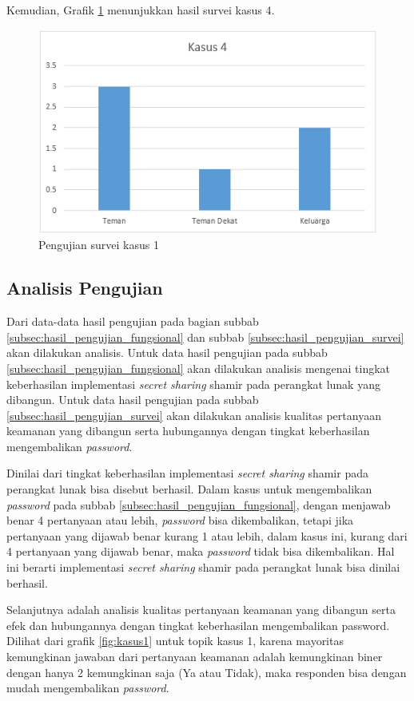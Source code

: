 Kemudian, Grafik \ref{fig:kasus4} menunjukkan hasil survei kasus 4.
\begin{figure}[H]
	\includegraphics[scale=0.7]{Gambar/kasus4}
	\centering
	\caption{Pengujian survei kasus 1}\label{fig:kasus4}
\end{figure}

\subsection{Analisis Pengujian}

Dari data-data hasil pengujian pada bagian subbab \ref{subsec:hasil_pengujian_fungsional} dan subbab \ref{subsec:hasil_pengujian_survei} akan dilakukan analisis. Untuk data hasil pengujian pada subbab \ref{subsec:hasil_pengujian_fungsional} akan dilakukan analisis mengenai tingkat keberhasilan implementasi \textit{secret sharing} shamir pada perangkat lunak yang dibangun. Untuk data hasil pengujian pada subbab \ref{subsec:hasil_pengujian_survei} akan dilakukan analisis kualitas pertanyaan keamanan yang dibangun serta hubungannya dengan tingkat keberhasilan mengembalikan \textit{password}.

Dinilai dari tingkat keberhasilan implementasi \textit{secret sharing} shamir pada perangkat lunak bisa disebut berhasil. Dalam kasus untuk mengembalikan \textit{password} pada subbab \ref{subsec:hasil_pengujian_fungsional}, dengan menjawab benar 4 pertanyaan atau lebih, \textit{password} bisa dikembalikan, tetapi jika pertanyaan yang dijawab benar kurang 1 atau lebih, dalam kasus ini, kurang dari 4 pertanyaan yang dijawab benar, maka \textit{password} tidak bisa dikembalikan. Hal ini berarti implementasi \textit{secret sharing} shamir pada perangkat lunak bisa dinilai berhasil.

Selanjutnya adalah analisis kualitas pertanyaan keamanan yang dibangun serta efek dan hubungannya dengan tingkat keberhasilan mengembalikan password. Dilihat dari grafik \ref{fig:kasus1} untuk topik kasus 1, karena mayoritas kemungkinan jawaban dari pertanyaan keamanan adalah kemungkinan biner dengan hanya 2 kemungkinan saja (Ya atau Tidak), maka responden bisa dengan mudah mengembalikan \textit{password}.

